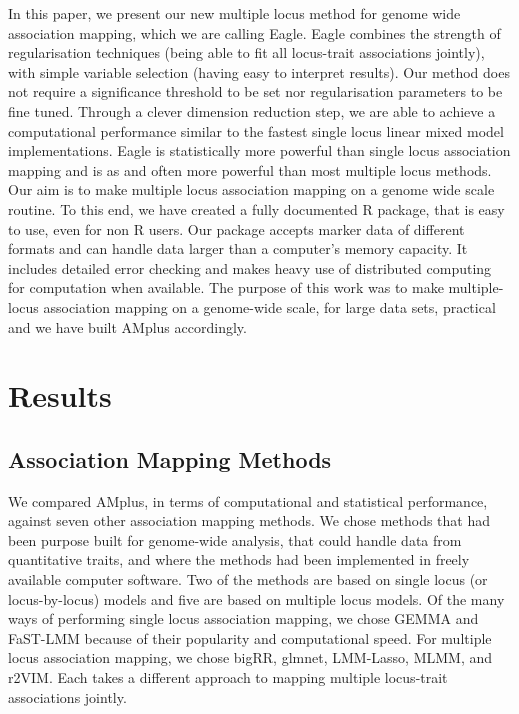 \documentclass[12pt]{article}
\begin{document}
In this paper, we present our new multiple locus method for genome wide association mapping, which we are calling Eagle. Eagle combines the strength of regularisation techniques (being able to fit all locus-trait associations jointly), with simple variable selection (having easy to interpret results). Our method does not require a significance threshold to be set nor regularisation parameters to be fine tuned. Through a clever dimension reduction step, we are able to achieve a computational performance similar to the fastest single locus linear mixed model implementations. Eagle is statistically more powerful than single locus association mapping and is as and often more powerful than 
most multiple locus methods. Our aim is to make multiple locus association mapping on a genome wide scale routine. To this end, we have created a fully documented R package, that is easy to use, even for non R users.  Our package accepts marker data of different 
formats and can handle data larger than a computer's  memory capacity. It includes detailed error checking and makes heavy use of 
distributed computing for computation when available.  The purpose of this work was to make multiple-locus association mapping on 
a genome-wide scale, for large data sets,  practical and we have built AMplus accordingly. 


\section{Results}

\subsection{Association Mapping Methods}

We compared AMplus, in terms of computational and statistical performance, against seven other association mapping methods. 
We chose methods that had been purpose built for genome-wide analysis, that could handle data from quantitative traits, and where the methods had been implemented in freely available computer software. Two of the methods are based on single locus (or locus-by-locus) models and five are based on multiple locus models. Of the many ways of performing single locus association mapping, we chose GEMMA and FaST-LMM because of their popularity and computational speed. For multiple locus association mapping, we chose bigRR, glmnet, LMM-Lasso, MLMM, and r2VIM.  Each takes a different approach to mapping multiple locus-trait associations jointly.
\end{document}
